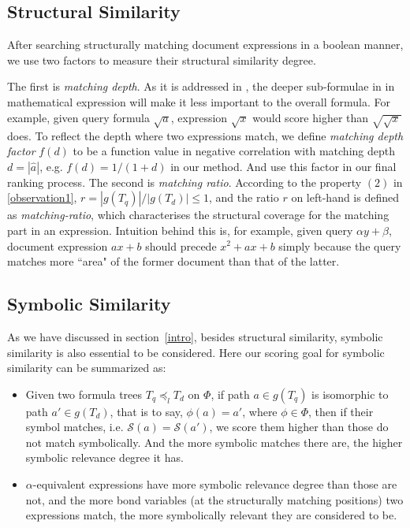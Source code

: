 \documentclass{acm_proc_article-sp}
\begin{document}
\subsection{Structural Similarity}
After searching structurally matching document expressions in a boolean manner, we use two factors to measure their structural similarity degree. 

The first is \textit{matching depth}.
As it is addressed in \cite{mias11a}, the deeper sub-formulae in in mathematical expression will make it less important to the overall formula.
For example, given query formula $\sqrt a$, expression $\sqrt {x}$ would score higher than $\sqrt{\sqrt{x}}$ does. 
To reflect the depth where two expressions match, we define \textit{matching depth factor} $f(d)$ to be a function value in negative correlation with matching depth $d = |\hat{a}|$, e.g. $f(d) = 1/(1 + d)$ in our method. And use this factor in our final ranking process.
The second is \textit{matching ratio}. According to the property $(2)$ in \ref{observation1}, 
$r = |g(T_q)| / |g(T_d)| \le 1$, and the ratio $r$ on left-hand is defined as \textit{matching-ratio}, which characterises the structural coverage for the matching part in an expression.
Intuition behind this is, for example, given query $\alpha y + \beta$, document expression $ax + b$ should precede $x^2 + ax + b$ simply because the query matches more ``area" of the former document than that of the latter.

\subsection{Symbolic Similarity}
As we have discussed in section~\ref{intro}, besides structural similarity, symbolic similarity is also essential to be considered.
Here our scoring goal for symbolic similarity can be summarized as:
\begin{itemize}
\item Given two formula trees
$T_q \preceq_l T_d$ on $\Phi$,  
if path $a \in g(T_q)$ is isomorphic to path $a' \in g(T_d)$, that is to say, $\phi(a)=a'$, where $\phi \in \Phi$, then if their symbol matches, i.e. $\mathcal{S}(a) = \mathcal{S}(a')$, we score them higher than those do not match symbolically. And the more symbolic matches there are, the higher symbolic relevance degree it has.
\item $\alpha$-equivalent expressions have more symbolic relevance degree than those are not, and the more bond variables (at the structurally matching positions) two expressions match, the more symbolically relevant they are considered to be.
\end{itemize}
\end{document}

